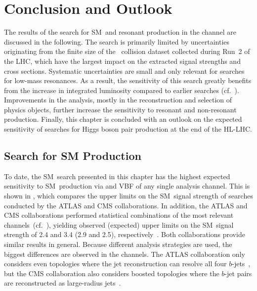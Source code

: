\section{Conclusion and Outlook}%
\label{sec:result_discussion}

The results of the search for SM~\HH and resonant \HH production in the
\bbtautau channel are discussed in the following. The search is primarily
limited by uncertainties originating from the finite size of the \pp~collision
dataset collected during Run~2 of the LHC, which have the largest impact on the
extracted signal strengths and cross sections. Systematic uncertainties are
small and only relevant for searches for low-mass resonances. As a result, the
sensitivity of this search greatly benefits from the increase in integrated
luminosity compared to earlier searches
(cf.~). Improvements in the analysis, mostly in
the reconstruction and selection of physics objects, further increase the
sensitivity to resonant and non-resonant \HH production. Finally, this chapter
is concluded with an outlook on the expected sensitivity of searches for Higgs
boson pair production at the end of the HL-LHC.

\subsection{Search for SM \HH Production}

To date, the SM~\HH search presented in this chapter has the highest expected
sensitivity to SM~\HH production via \ggF and VBF of any single analysis
channel. This is shown in , which compares the upper
limits on the SM~\HH signal strength of searches conducted by the ATLAS and CMS
collaborations. In addition, the ATLAS and CMS collaborations performed
statistical combinations of the most relevant
channels~(cf.~), yielding observed (expected) upper
limits on the SM~\HH signal strength of 2.4 and 3.4 (2.9 and 2.5),
respectively~\cite{HDBS-2022-03,CMS-HIG-22-001}.
Both collaborations provide similar results in general. Because different
analysis strategies are used, the biggest differences are observed in the \bbbb
channels. The ATLAS collaboration only considers even topologies where the jet
reconstruction can resolve all four $b$-jets~\cite{ATLAS-CONF-2022-035}, but the
CMS collaboration also considers boosted topologies where the $b$-jet pairs are
reconstructed as large-radius jets~\cite{CMS-HIG-20-005,CMS-B2G-22-003}.

